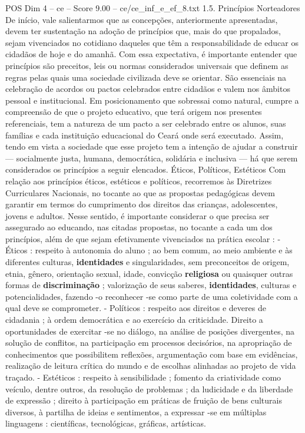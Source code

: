 \begin{textsample}{POS Dim 4 – ce – Score 9.00 – ce/ce\_inf\_e\_ef\_8.txt}  \label{ex:f4_pos_136}
1.5.
Princípios Norteadores De início, vale salientarmos que as concepções, anteriormente apresentadas, devem ter sustentação na adoção de princípios que, mais do que propalados, sejam vivenciados no cotidiano daqueles que têm a responsabilidade de educar os cidadãos de hoje e do amanhã.
Com essa expectativa, é importante entender que princípios são preceitos, leis ou normas considerados universais que definem as regras pelas quais uma sociedade civilizada deve se orientar.
São essenciais na celebração de acordos ou pactos celebrados entre cidadãos e valem nos âmbitos pessoal e institucional.
Em posicionamento que sobressai como natural, cumpre a compreensão de que o projeto educativo, que terá origem nos presentes referenciais, tem a natureza de um pacto a ser celebrado entre os alunos, suas famílias e cada instituição educacional do Ceará onde será executado.
Assim, tendo em vista a sociedade que esse projeto tem a intenção de ajudar a construir — socialmente justa, humana, democrática, solidária e inclusiva — há que serem considerados os princípios a seguir elencados.
Éticos, Políticos, Estéticos Com relação aos princípios éticos, estéticos e políticos, recorremos às Diretrizes Curriculares Nacionais, no tocante ao que as propostas pedagógicas devem garantir em termos do cumprimento dos direitos das crianças, adolescentes, jovens e adultos.
Nesse sentido, é importante considerar o que precisa ser assegurado ao educando, nas citadas propostas, no tocante a cada um dos princípios, além de que sejam efetivamente vivenciados na prática escolar : - Éticos : respeito à autonomia do aluno ; ao bem comum, ao meio ambiente e às diferentes culturas, \textbf{identidades} e singularidades, sem preconceitos de origem, etnia, gênero, orientação sexual, idade, convicção \textbf{religiosa} ou quaisquer outras formas de \textbf{discriminação} ; valorização de seus saberes, \textbf{identidades}, culturas e potencialidades, fazendo -o reconhecer -se como parte de uma coletividade com a qual deve se comprometer. - Políticos : respeito aos direitos e deveres de cidadania ; à ordem democrática e ao exercício da criticidade.
Direito a oportunidades de exercitar -se no diálogo, na análise de posições divergentes, na solução de conflitos, na participação em processos decisórios, na apropriação de conhecimentos que possibilitem reflexões, argumentação com base em evidências, realização de leitura crítica do mundo e de escolhas alinhadas ao projeto de vida traçado. - Estéticos : respeito à sensibilidade ; fomento da criatividade como veículo, dentre outros, da resolução de problemas ; da ludicidade e da liberdade de expressão ; direito à participação em práticas de fruição de bens culturais diversos, à partilha de ideias e sentimentos, a expressar -se em múltiplas linguagens : científicas, tecnológicas, gráficas, artísticas.

\end{textsample}
